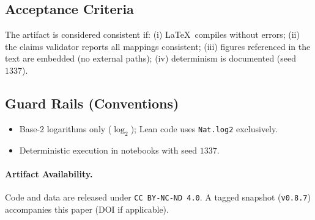 \subsection{Acceptance Criteria}
The artifact is considered consistent if: (i) \LaTeX\ compiles without errors; (ii) the claims validator reports all mappings consistent; (iii) figures referenced in the text are embedded (no external paths); (iv) determinism is documented (seed~\(1337\)).

\subsection{Guard Rails (Conventions)}
\begin{itemize}
  \item Base-2 logarithms only (\(\log_{2}\)); Lean code uses \texttt{Nat.log2} exclusively.
  \item Deterministic execution in notebooks with seed \(1337\).
\end{itemize}

\paragraph{Artifact Availability.}
Code and data are released under \texttt{CC BY-NC-ND 4.0}. A tagged snapshot (\texttt{v0.8.7}) accompanies this paper (DOI if applicable).

